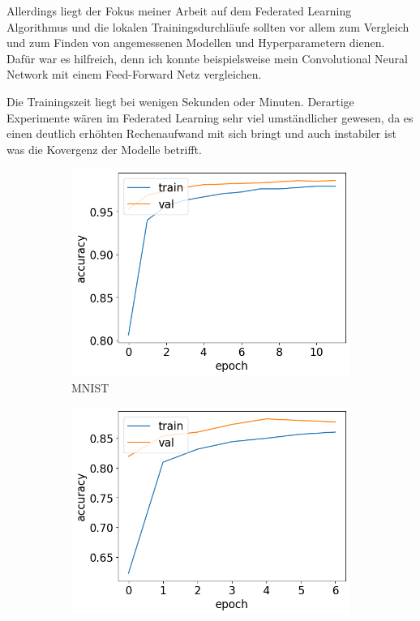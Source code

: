 Allerdings liegt der Fokus meiner Arbeit auf dem Federated Learning Algorithmus und die lokalen Trainingsdurchläufe sollten vor allem zum Vergleich und zum Finden von angemessenen Modellen und Hyperparametern dienen. Dafür war es hilfreich, denn ich konnte beispielsweise mein Convolutional Neural Network mit einem Feed-Forward Netz vergleichen. 

Die Trainingszeit liegt bei wenigen Sekunden oder Minuten. Derartige Experimente wären im Federated Learning sehr viel umständlicher gewesen, da es einen deutlich erhöhten Rechenaufwand mit sich bringt und auch instabiler ist was die Kovergenz der Modelle betrifft.

\begin{figure}
	\centering
	\begin{subfigure}{0.32\textwidth}
		\centering
		\includegraphics[width=\textwidth]{Bilder/mnist-results-local.png}
		\caption{MNIST}
	\end{subfigure}
	\begin{subfigure}{0.32\textwidth}
		\centering
		\includegraphics[width=\textwidth]{Bilder/svhn-results-local.png}

\end{subfigure}
\end{figure}
